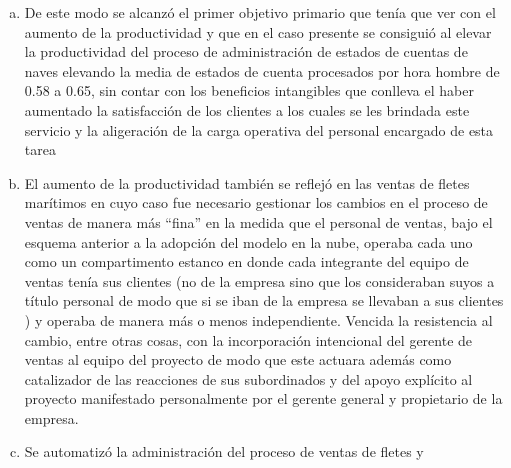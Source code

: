 \begin{enumerate}[a.]
          o de lo contrario con la compra de un software ya echo y que deb\'ia
          pasar por un doloroso proceso de personalizaci\'on con la compra tambi\'en
          de licencias, eventualmente de equipos y siempre con la participaci\'on
          de expertos en inform\'atica, se pas\'o de pronto al empleo de aplicaciones
          en la nube listas para ser usadas desde el primer momento y que inclusive
          pod\'ian ser buscadas y encontradas en Internet con la ayuda de los
          mismos interesados sin que mediara ``un equipo de expertos de TI'',
          con la posibilidad adem\'as de usar un periodo de prueba gratuito,
          usualmente de un mes, otorgado por los proveedores
    \item De este modo se alcanz\'o el primer objetivo primario que ten\'ia que
          ver con el aumento de la productividad y que en el caso presente se
          consigui\'o al elevar la productividad del proceso de administraci\'on
          de estados de cuentas de naves elevando la media de estados de cuenta
          procesados por hora hombre de 0.58 a 0.65, sin contar con los beneficios
          intangibles que conlleva el haber aumentado la satisfacci\'on de los
          clientes a los cuales se les brindada este servicio y la aligeraci\'on
          de la carga operativa del personal encargado de esta tarea
    \item El aumento de la productividad tambi\'en se reflej\'o en las ventas de
          fletes mar\'itimos en cuyo caso fue necesario gestionar los cambios en
          el proceso de ventas de manera m\'as ``fina'' en la medida que el personal
          de ventas, bajo el esquema anterior a la adopci\'on del modelo en la
          nube, operaba cada uno como un compartimento estanco en donde cada
          integrante del equipo de ventas ten\'ia sus clientes (no de la empresa
          sino que los consideraban suyos a t\'itulo personal de modo que si se
          iban de la empresa se llevaban a sus clientes ) y operaba de manera
          m\'as o menos independiente. Vencida la resistencia al cambio, entre
          otras cosas, con la incorporaci\'on intencional del gerente de ventas
          al equipo del proyecto de modo que este actuara adem\'as como catalizador
          de las reacciones de sus subordinados y del apoyo expl\'icito al
          proyecto manifestado personalmente por el gerente general y propietario
          de la empresa.
    \item Se automatiz\'o la administraci\'on del proceso de ventas de fletes y

\end{enumerate}
